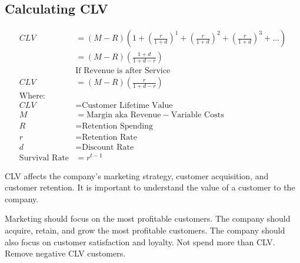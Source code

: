 \subsection{Calculating CLV}
{\scriptsize \begin{align*}
	CLV &= (M-R)\left(1+\left(\frac{r}{1+d}\right)^1+\left(\frac{r}{1+d}\right)^2+\left(\frac{r}{1+d}\right)^3 + \ldots \right) \\
	&= (M-R)\left(\frac{1+d}{1+d-r}\right) \\
	&\text{If Revenue is after Service} \\
	CLV &= (M-R)\left(\frac{r}{1+d-r}\right) \\
	\text{Where:} \\
	CLV &= \text{Customer Lifetime Value} \\
	M &= \text{Margin aka Revenue} - \text{Variable Costs} \\
	R &= \text{Retention Spending} \\
	r &= \text{Retention Rate} \\
	d &= \text{Discount Rate}\\
	\text{Survival Rate} &= r^{t-1}
\end{align*}}

CLV affects the company's marketing strategy, customer acquisition, and customer retention. It is important to understand the value of a customer to the company.

Marketing should focus on the most profitable customers. The company should acquire, retain, and grow the most profitable customers. The company should also focus on customer satisfaction and loyalty. Not spend more than CLV. Remove negative CLV customers.

